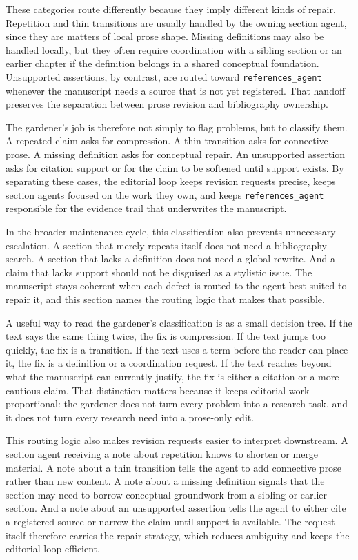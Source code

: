 These categories route differently because they imply different kinds of repair. Repetition and thin transitions are usually handled by the owning section agent, since they are matters of local prose shape. Missing definitions may also be handled locally, but they often require coordination with a sibling section or an earlier chapter if the definition belongs in a shared conceptual foundation. Unsupported assertions, by contrast, are routed toward \texttt{references\_agent} whenever the manuscript needs a source that is not yet registered. That handoff preserves the separation between prose revision and bibliography ownership.

The gardener's job is therefore not simply to flag problems, but to classify them. A repeated claim asks for compression. A thin transition asks for connective prose. A missing definition asks for conceptual repair. An unsupported assertion asks for citation support or for the claim to be softened until support exists. By separating these cases, the editorial loop keeps revision requests precise, keeps section agents focused on the work they own, and keeps \texttt{references\_agent} responsible for the evidence trail that underwrites the manuscript.

In the broader maintenance cycle, this classification also prevents unnecessary escalation. A section that merely repeats itself does not need a bibliography search. A section that lacks a definition does not need a global rewrite. And a claim that lacks support should not be disguised as a stylistic issue. The manuscript stays coherent when each defect is routed to the agent best suited to repair it, and this section names the routing logic that makes that possible.

A useful way to read the gardener's classification is as a small decision tree. If the text says the same thing twice, the fix is compression. If the text jumps too quickly, the fix is a transition. If the text uses a term before the reader can place it, the fix is a definition or a coordination request. If the text reaches beyond what the manuscript can currently justify, the fix is either a citation or a more cautious claim. That distinction matters because it keeps editorial work proportional: the gardener does not turn every problem into a research task, and it does not turn every research need into a prose-only edit.

This routing logic also makes revision requests easier to interpret downstream. A section agent receiving a note about repetition knows to shorten or merge material. A note about a thin transition tells the agent to add connective prose rather than new content. A note about a missing definition signals that the section may need to borrow conceptual groundwork from a sibling or earlier section. And a note about an unsupported assertion tells the agent to either cite a registered source or narrow the claim until support is available. The request itself therefore carries the repair strategy, which reduces ambiguity and keeps the editorial loop efficient.


